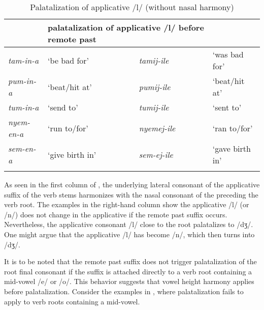 \documentclass[output=paper]{langsci/langscibook}
\begin{document}
\begin{table}
\begin{tabularx}{\textwidth}{lXll}
\lsptoprule
\multicolumn{2}{l}{Root-applicative-\textsc{fv}}  & \multicolumn{2}{p{5cm}}{palatalization of applicative /l/ before remote past} \\
\midrule 
\textit{tam-in-a} & `be bad for' & \textit{tamij-ile} & `was bad for' \\
\textit{pum-in-a} & `beat/hit at' & \textit{pumij-ile} & `beat/hit at' \\
\textit{tum-in-a} & `send to' & \textit{tumij-ile} & `sent to' \\
\textit{nyem-en-a} & `run to/for' & \textit{nyemej-ile} & `ran to/for' \\
\textit{sem-en-a} & `give birth in' & \textit{sem-ej-ile} & `gave birth in' \\

\lspbottomrule
\end{tabularx}

\caption{Palatalization of applicative /l/ (without nasal harmony)}
\label{tab:15.kawasha}

\end{table}

As seen in the first column of , the underlying lateral consonant of the applicative suffix of the verb stems harmonizes with the nasal consonant of the preceding the verb root. The examples in the right-hand column show the applicative /l/ (or /n/) does not change in the applicative if the remote past suffix occurs. Nevertheless, the applicative consonant /l/ close to the root palatalizes to /dʒ/. One might argue that the applicative /l/ has become /n/, which then turns into /dʒ/. 

It is to be noted that the remote past suffix does not trigger palatalization of the root final consonant if the suffix is attached directly to a verb root containing a mid-vowel /e/ or /o/. This behavior suggests that vowel height harmony applies before palatalization. Consider the examples in , where palatalization fails to apply to verb roots containing a mid-vowel. 
\end{document}
